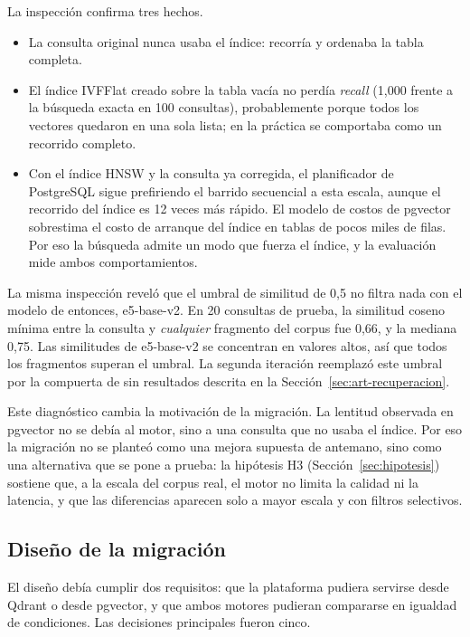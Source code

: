 La inspección confirma tres hechos.
\begin{itemize}
    \item La consulta original nunca usaba el índice: recorría y ordenaba la tabla completa.
    \item El índice IVFFlat creado sobre la tabla vacía no perdía \textit{recall} (1,000 frente a la búsqueda exacta en 100 consultas), probablemente porque todos los vectores quedaron en una sola lista; en la práctica se comportaba como un recorrido completo.
    \item Con el índice HNSW y la consulta ya corregida, el planificador de PostgreSQL sigue prefiriendo el barrido secuencial a esta escala, aunque el recorrido del índice es 12 veces más rápido. El modelo de costos de pgvector sobrestima el costo de arranque del índice en tablas de pocos miles de filas. Por eso la búsqueda admite un modo que fuerza el índice, y la evaluación mide ambos comportamientos.
\end{itemize}

La misma inspección reveló que el umbral de similitud de 0,5 no filtra nada con el modelo de entonces, e5-base-v2. En 20 consultas de prueba, la similitud coseno mínima entre la consulta y \emph{cualquier} fragmento del corpus fue 0,66, y la mediana 0,75. Las similitudes de e5-base-v2 se concentran en valores altos, así que todos los fragmentos superan el umbral. La segunda iteración reemplazó este umbral por la compuerta de sin resultados descrita en la Sección~\ref{sec:art-recuperacion}.

Este diagnóstico cambia la motivación de la migración. La lentitud observada en pgvector no se debía al motor, sino a una consulta que no usaba el índice. Por eso la migración no se planteó como una mejora supuesta de antemano, sino como una alternativa que se pone a prueba: la hipótesis H3 (Sección~\ref{sec:hipotesis}) sostiene que, a la escala del corpus real, el motor no limita la calidad ni la latencia, y que las diferencias aparecen solo a mayor escala y con filtros selectivos.

\subsection{Diseño de la migración}

El diseño debía cumplir dos requisitos: que la plataforma pudiera servirse desde Qdrant \citep{QdrantDocs} o desde pgvector, y que ambos motores pudieran compararse en igualdad de condiciones. Las decisiones principales fueron cinco.

